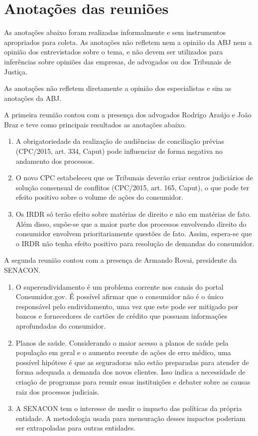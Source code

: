 \documentclass[]{report}
\providecommand{\tightlist}{%
  \setlength{\itemsep}{0pt}\setlength{\parskip}{0pt}}
\begin{document}
\section{Anotações das reuniões}\label{anotacoes-das-reunioes}

As anotações abaixo foram realizadas informalmente e sem instrumentos
apropriados para coleta. As anotações não refletem nem a opinião da ABJ
nem a opinião dos entrevistados sobre o tema, e não devem ser utilizados
para inferências sobre opiniões das empresas, de advogados ou dos
Tribunais de Justiça.

As anotações não refletem diretamente a opinião dos especialistas e sim
as anotações da ABJ.

A primeira reunião contou com a presença dos advogados Rodrigo Araújo e
João Braz e teve como principais resultados as anotações abaixo.

\begin{enumerate}
\def\labelenumi{\arabic{enumi}.}
\tightlist
\item
  A obrigatoriedade da realização de audiências de conciliação prévias
  (CPC/2015, art. 334, Caput) pode influenciar de forma negativa no
  andamento dos processos.
\item
  O novo CPC estabeleceu que os Tribunais deverão criar centros
  judiciários de solução consensual de conflitos (CPC/2015, art. 165,
  Caput), o que pode ter efeito positivo sobre o volume de ações do
  consumidor.
\item
  Os IRDR só terão efeito sobre matérias de direito e não em matérias de
  fato. Além disso, supõe-se que a maior parte dos processos envolvendo
  direito do consumidor envolvem prioritariamente questões de fato.
  Assim, espera-se que o IRDR não tenha efeito positivo para resolução
  de demandas do consumidor.
\end{enumerate}

A segunda reunião contou com a presença de Armando Rovai, presidente da
SENACON.

\begin{enumerate}
\def\labelenumi{\arabic{enumi}.}
\tightlist
\item
  O superendividamento é um problema corrente nos canais do portal
  Consumidor.gov. É possível afirmar que o consumidor não é o único
  responsável pelo endividamento, uma vez que este pode ser mitigado por
  bancos e fornecedores de cartões de crédito que possuam informações
  aprofundadas do consumidor.
\item
  Planos de saúde. Considerando o maior acesso a planos de saúde pela
  população em geral e o aumento recente de ações de erro médico, uma
  possível hipótese é que as seguradoras não estão preparadas para
  atender de forma adequada a demanda dos novos clientes. Isso indica a
  necessidade de criação de programas para reunir essas instituições e
  debater sobre as causas raiz dos processos judiciais.
\item
  A SENACON tem o interesse de medir o impacto das políticas da própria
  entidade. A metodologia usada para mensuração desses impactos poderiam
  ser extrapoladas para outras entidades.
\end{enumerate}
\end{document}
